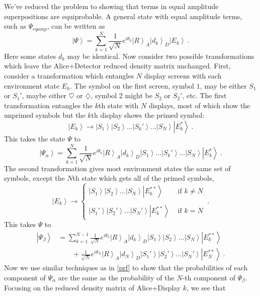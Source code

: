 \documentclass[12pt,onecolumn,secnumarabic,amsmath,amssymb,balancelastpage,nofootinbib]{article}
\newcommand{\ket}[1]{\ensuremath{\left|#1\right\rangle}}
\begin{document}
We've reduced the problem to showing that terms in equal amplitude superpositions are equiprobable.  A general state with equal amplitude terms, such as $\Psi_{eqamp}$, can be written as
\begin{equation}
\ket{\Psi}=\sum_{k=1}^N{\frac{1}{\sqrt{N}}e^{i\theta_k}\ket{R}_A\ket{d_k}_D\ket{E_k}}\ .
\label{psipsipsi}
\end{equation}
Here some states $d_k$ may be identical.  Now consider two possible transformations which leave the Alice+Detector reduced density matrix unchanged.  First, consider a transformation which entangles $N$ display screens with each environment state $E_k$.  The symbol on the first screen, symbol $1$, may be either $S_1$ or $S_1'$, maybe either $\heartsuit$ or $\diamondsuit$, symbol 2 might be $S_2$ or $S_2'$, etc.  The first transformation entangles the $k$th state with $N$ displays, most of which show the unprimed symbols but the $k$th display shows the primed symbol:
\begin{equation}
\ket{E_k}\longrightarrow\ket{S_1}\ket{S_2}...\ket{S_k'}...\ket{S_N}\ket{E_k^*}\ .
\label{}
\end{equation}
This takes the state $\Psi$ to
\begin{equation}
\ket{\Psi_\alpha}=\sum_{k=1}^N{\frac{1}{\sqrt{N}}e^{i\theta_k}\ket{R}_A\ket{d_k}_D\ket{S_1}...\ket{S_k'}...\ket{S_N}\ket{E_k^*}}\ .
\label{psialphaalpha}
\end{equation}
The second transformation gives most environment states the same set of symbols, except the $N$th state which gets all of the primed symbols,
\begin{equation}
\ket{E_k}\longrightarrow\left\{\begin{array}{ll} \ket{S_1}\ket{S_2}...\ket{S_N}\ket{E_k^{**}} & \text{   if }k\neq N \\\\ \ket{S_1'}\ket{S_2'}...\ket{S_N'}\ket{E_k^{**}} & \text{   if }k= N  \end{array}\right.\ .
\label{}
\end{equation}
This takes $\Psi$ to
\begin{align}
\ket{\Psi_\beta}&= \sum_{k=1}^{N-1}{\frac{1}{\sqrt{N}}e^{i\theta_k}\ket{R}_A\ket{d_k}_D\ket{S_1}\ket{S_2}...\ket{S_N}\ket{E_k^{**}}}
\nonumber
\\
&\qquad+ \frac{1}{\sqrt{N}}e^{i\theta_N}\ket{R}_A\ket{d_N}_D\ket{S_1'}\ket{S_2'}...\ket{S_N'}\ket{E_N^{**}}\ .
\label{}
\end{align}
Now we use similar techniques as in \textsection \ref{prf} to show that the probabilities of each component of $\Psi_\alpha$ are the same as the probability of the $N$-th component of $\Psi_\beta$.  Focusing on the reduced density matrix of Alice+Display $k$, we see that 
\end{document}
